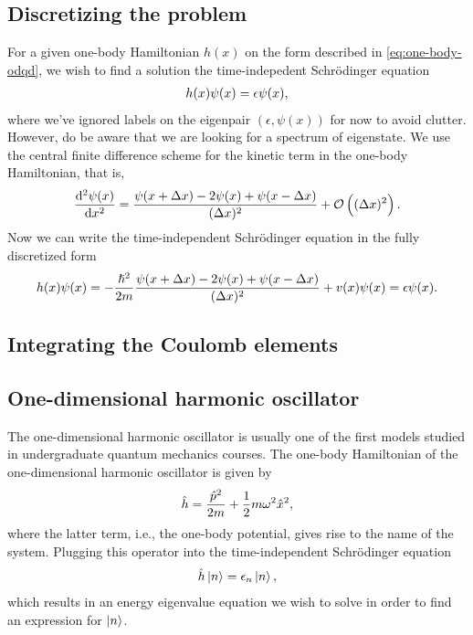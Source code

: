     \subsection{Discretizing the problem}
        For a given one-body Hamiltonian $h(x)$ on the form described in
        \autoref{eq:one-body-odqd}, we wish to find a solution the
        time-indepedent Schrödinger equation
        \begin{align}
            h(x)\psi(x) = \epsilon \psi(x),
        \end{align}
        where we've ignored labels on the eigenpair $(\epsilon, \psi(x))$ for
        now to avoid clutter.
        However, do be aware that we are looking for a spectrum of eigenstate.
        We use the central finite difference scheme for the kinetic term in the
        one-body Hamiltonian, that is,
        \begin{align}
            \dod[2]{\psi(x)}{x}
            = \frac{
                \psi(x + \Delta x) - 2\psi(x) + \psi(x - \Delta x)
            }{(\Delta x)^2}
            + \mathcal{O}\para{(\Delta x)^2}.
        \end{align}
        Now we can write the time-independent Schrödinger equation in the fully
        discretized form
        \begin{align}
            h(x) \psi(x)
            = -\frac{\hslash^2}{2m}
            \frac{
                \psi(x + \Delta x) - 2\psi(x) + \psi(x - \Delta x)
            }{(\Delta x)^2}
            + v(x)\psi(x)
            = \epsilon \psi(x).
        \end{align}

    \subsection{Integrating the Coulomb elements}

    \subsection{One-dimensional harmonic oscillator}
        The one-dimensional harmonic oscillator is usually one of the first
        models studied in undergraduate quantum mechanics courses.
        The one-body Hamiltonian of the one-dimensional harmonic oscillator is
        given by
        \begin{align}
            \hat{h} = \frac{\hat{p}^2}{2m} + \frac{1}{2} m\omega^2 \hat{x}^2,
            \label{eq:1dho-hamiltonian}
        \end{align}
        where the latter term, i.e., the one-body potential, gives rise to the
        name of the system.
        Plugging this operator into the time-independent Schrödinger equation
        \begin{gather}
            \hat{h}\ket{n} = \epsilon_n\ket{n},
        \end{gather}
        which results in an energy eigenvalue equation we wish to solve in order
        to find an expression for $\ket{n}$.

